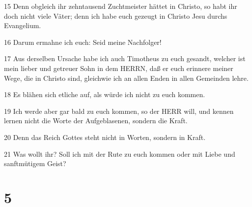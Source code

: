 \par 15 Denn obgleich ihr zehntausend Zuchtmeister hättet in Christo, so habt ihr doch nicht viele Väter; denn ich habe euch gezeugt in Christo Jesu durchs Evangelium.
\par 16 Darum ermahne ich euch: Seid meine Nachfolger!
\par 17 Aus derselben Ursache habe ich auch Timotheus zu euch gesandt, welcher ist mein lieber und getreuer Sohn in dem HERRN, daß er euch erinnere meiner Wege, die in Christo sind, gleichwie ich an allen Enden in allen Gemeinden lehre.
\par 18 Es blähen sich etliche auf, als würde ich nicht zu euch kommen.
\par 19 Ich werde aber gar bald zu euch kommen, so der HERR will, und kennen lernen nicht die Worte der Aufgeblasenen, sondern die Kraft.
\par 20 Denn das Reich Gottes steht nicht in Worten, sondern in Kraft.
\par 21 Was wollt ihr? Soll ich mit der Rute zu euch kommen oder mit Liebe und sanftmütigem Geist?

\chapter{5}

